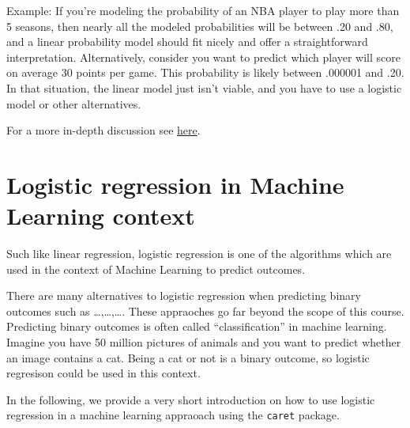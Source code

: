 \documentclass[
]{book}
\begin{document}
Example: If you're modeling the probability of an NBA player to play more than 5 seasons, then nearly all the modeled probabilities will be between .20 and .80, and a linear probability model should fit nicely and offer a straightforward interpretation. Alternatively, consider you want to predict which player will score on average 30 points per game. This probability is likely
between .000001 and .20. In that situation, the linear model just isn't viable, and you have to use a logistic model or other alternatives.

For a more in-depth discussion see \href{https://statisticalhorizons.com/linear-vs-logistic/}{here}.

\hypertarget{logistic-regression-in-machine-learning-context}{%
\section{Logistic regression in Machine Learning context}\label{logistic-regression-in-machine-learning-context}}

Such like linear regression, logistic regression is one of the algorithms which
are used in the context of Machine Learning to predict outcomes.

There are many alternatives to logistic regression when predicting binary outcomes such as \ldots,\ldots,\ldots. These appraoches go far beyond the scope of this course. Predicting binary outcomes is often called ``classification'' in machine learning.
Imagine you have 50 million pictures of animals and you want to predict whether
an image contains a cat. Being a cat or not is a binary outcome, so logistic regresison could be used in this context.

In the following, we provide a very short introduction on how to use logistic regression in a machine learning appraoach using the \texttt{caret} package.
\end{document}

